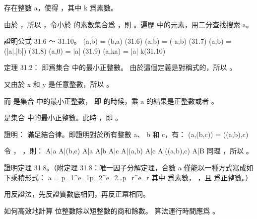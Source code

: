 存在整數 a，使得 ，其中 k 爲素數。

由於 ，所以 ，令小於 \m{\beta} 的素數集合爲 \m{\primes_\beta}，則 。遍歷 \m{\primes_\beta} 中的元素，用二分查找搜索 a。
\stopANSWER

\startEXERCISE
證明公式 31.6 ～ 31.10。
\startformula\startmathalignment[
  n=3,
  align={left,left,right},]
\NC \gcd(a,b)  \NC = \gcd(b,a)     \NC (31.6) \NR
\NC \gcd(a,b)  \NC = \gcd(-a,b)    \NC (31.7) \NR
\NC \gcd(a,b)  \NC = \gcd(|a|,|b|) \NC (31.8) \NR
\NC \gcd(a,0)  \NC = |a|           \NC (31.9) \NR
\NC \gcd(a,ka) \NC = |a| \qquad {}k\in\integers \NC \qquad (31.10) \NR
\stopmathalignment\stopformula
\stopEXERCISE

\startANSWER
定理 31.2：  即爲集合  中的最小正整數。
由於這個定義是對稱式的，所以 。

又由於 x 和 y 是任意整數，所以 。

而  是集合  中的最小正整數，
即  的時候，乘 a 的結果是正整數或者 。

 是集合  中的最小正整數。此時 ，即 。
\stopANSWER

\startEXERCISE
證明： \m{\gcd} 滿足結合律。即證明對於所有整數 a、 b 和 c，有：
\startformula
\gcd(a,\gcd(b,c)) = \gcd(\gcd(a,b),c)
\stopformula
\stopEXERCISE

\startANSWER
令 ， ，則：
\startformula\startmathalignment[n=1]
\NC A|a \qquad A|\gcd(b,c) \NR
\NC A|a \qquad A|b \qquad A|c \NR
\NC A|\gcd(a,b) \qquad A|c \NR
\NC A|\gcd(\gcd(a,b),c) \NR
\NC A|B \NR
\stopmathalignment\stopformula
同理 ，所以 。
\stopANSWER

\startEXERCISE\DIFFICULT
證明定理 31.8。（附{\EMP 定理 31.8}：唯一因子分解定理，合數 a 僅能以一種方式寫成如下乘積形式：
\startformula
a = p_1^{e_1}p_2^{e_2}\ldots p_r^{e_r}
\stopformula
其中  爲素數， ，且  爲正整數。）
\stopEXERCISE

\startANSWER
用反證法，先反證質數底相同，再反正冪相同。
\stopANSWER

\startEXERCISE
如何高效地計算 \m{\beta} 位整數除以短整數的商和餘數。
算法運行時間應爲 。
\stopEXERCISE

